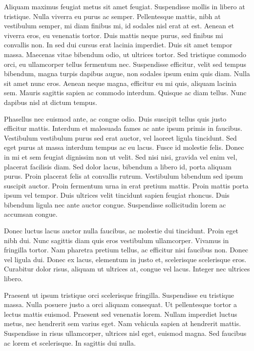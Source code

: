 Aliquam maximus feugiat metus sit amet feugiat. Suspendisse mollis in libero at tristique. Nulla viverra eu purus ac semper. Pellentesque mattis, nibh at vestibulum semper, mi diam finibus mi, id sodales nisl erat at est. Aenean et viverra eros, eu venenatis tortor. Duis mattis neque purus, sed finibus mi convallis non. In sed dui cursus erat lacinia imperdiet. Duis sit amet tempor massa. Maecenas vitae bibendum odio, ut ultrices tortor. Sed tristique commodo orci, eu ullamcorper tellus fermentum nec. Suspendisse efficitur, velit sed tempus bibendum, magna turpis dapibus augue, non sodales ipsum enim quis diam. Nulla sit amet nunc eros. Aenean neque magna, efficitur eu mi quis, aliquam lacinia sem. Mauris sagittis sapien ac commodo interdum. Quisque ac diam tellus. Nunc dapibus nisl at dictum tempus.

Phasellus nec euismod ante, ac congue odio. Duis suscipit tellus quis justo efficitur mattis. Interdum et malesuada fames ac ante ipsum primis in faucibus. Vestibulum vestibulum purus sed erat auctor, vel laoreet ligula tincidunt. Sed eget purus at massa interdum tempus ac eu lacus. Fusce id molestie felis. Donec in mi et sem feugiat dignissim non ut velit. Sed nisi nisi, gravida vel enim vel, placerat facilisis diam. Sed dolor lacus, bibendum a libero id, porta aliquam purus. Proin placerat felis at convallis rutrum. Vestibulum bibendum sed ipsum suscipit auctor. Proin fermentum urna in erat pretium mattis. Proin mattis porta ipsum vel tempor. Duis ultrices velit tincidunt sapien feugiat rhoncus. Duis bibendum ligula nec ante auctor congue. Suspendisse sollicitudin lorem ac accumsan congue.

Donec luctus lacus auctor nulla faucibus, ac molestie dui tincidunt. Proin eget nibh dui. Nunc sagittis diam quis eros vestibulum ullamcorper. Vivamus in fringilla tortor. Nam pharetra pretium tellus, ac efficitur nisi faucibus non. Donec vel ligula dui. Donec ex lacus, elementum in justo et, scelerisque scelerisque eros. Curabitur dolor risus, aliquam ut ultrices at, congue vel lacus. Integer nec ultrices libero.

Praesent ut ipsum tristique orci scelerisque fringilla. Suspendisse eu tristique massa. Nulla posuere justo a orci aliquam consequat. Ut pellentesque tortor a lectus mattis euismod. Praesent sed venenatis lorem. Nullam imperdiet luctus metus, nec hendrerit sem varius eget. Nam vehicula sapien at hendrerit mattis. Suspendisse in risus ullamcorper, ultrices nisl eget, euismod magna. Sed faucibus ac lorem et scelerisque. In sagittis dui nulla.

